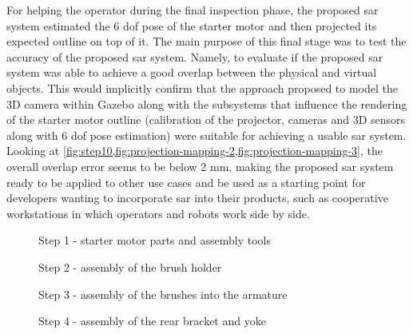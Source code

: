 For helping the operator during the final inspection phase, the proposed \gls{sar} system estimated the 6 \gls{dof} pose of the starter motor and then projected its expected outline on top of it. The main purpose of this final stage was to test the accuracy of the proposed \gls{sar} system. Namely, to evaluate if the proposed \gls{sar} system was able to achieve a good overlap between the physical and virtual objects. This would implicitly confirm that the approach proposed to model the 3D camera within Gazebo along with the subsystems that influence the rendering of the starter motor outline (calibration of the projector, cameras and 3D sensors along with 6 \gls{dof} pose estimation) were suitable for achieving a usable \gls{sar} system. Looking at \cref{fig:step10,fig:projection-mapping-2,fig:projection-mapping-3}, the overall overlap error seems to be below 2 mm, making the proposed \gls{sar} system ready to be applied to other use cases and be used as a starting point for developers wanting to incorporate \gls{sar} into their products, such as cooperative workstations in which operators and robots work side by side.

\begin{figure}[H]
	\begin{floatrow}[2]
		{\caption{Step 1 - starter motor parts and assembly tools}\label{fig:assembly-parts}\vspace{-0.5em}}
		{\caption{Step 2 - assembly of the brush holder}\label{fig:step2}\vspace{-0.5em}}
	\end{floatrow}
\end{figure}

\vspace{-1.5em}
\begin{figure}[H]
	\begin{floatrow}[2]
		{\caption{Step 3 - assembly of the brushes into the armature}\label{fig:step3}\vspace{-0.5em}}
		{\caption{Step 4 - assembly of the rear bracket and yoke}\label{fig:step4}\vspace{-0.5em}}
	\end{floatrow}
\end{figure}


